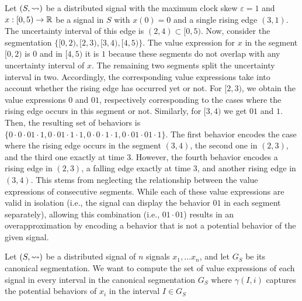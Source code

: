 \begin{example}
	Let $(S,{\rightsquigarrow})$ be a distributed signal with the maximum clock skew $\varepsilon = 1$ and $x : [0,5) \to \mathbb{R}$ be a signal in $S$ with $x(0) = 0$ and a single rising edge $(3, 1)$.
	The uncertainty interval of this edge is $(2,4) \subset [0,5)$.
	Now, consider the segmentation $\{ [0,2), [2,3), [3,4), [4,5) \}$.
	The value expression for $x$ in the segment $[0,2)$ is $0$ and in $[4,5)$ it is $1$ because these segments do not overlap with any uncertainty interval of $x$.
	The remaining two segments split the uncertainty interval in two.
	Accordingly, the corresponding value expressions take into account whether the rising edge has occurred yet or not.
	For $[2,3)$, we obtain the value expressions $0$ and $01$, respectively corresponding to the cases where the rising edge occurs in this segment or not.
	Similarly, for $[3,4)$ we get $01$ and $1$.
	Then, the resulting set of behaviors is $\{ 0 \cdot 0 \cdot 01 \cdot 1, 0 \cdot 01 \cdot 1 \cdot 1, 0 \cdot 0 \cdot 1 \cdot 1, 0 \cdot 01 \cdot 01 \cdot 1 \}$.
	The first behavior encodes the case where the rising edge occurs in the segment $(3,4)$, the second one in $(2,3)$, and the third one exactly at time $3$.
	However, the fourth behavior encodes a rising edge in $(2,3)$, a falling edge exactly at time $3$, and another rising edge in $(3,4)$.
	This stems from neglecting the relationship between the value expressions of consecutive segments.
	While each of these value expressions are valid in isolation (i.e., the signal can display the behavior $01$ in each segment separately), allowing this combination (i.e., $01 \cdot 01$) results in an overapproximation by encoding a behavior that is not a potential behavior of the given signal.
\end{example}

Let $(S,{\rightsquigarrow})$ be a distributed signal of $n$ signals $x_1, \ldots x_n$, and let $G_S$ be its canonical segmentation. %
We want to compute the set of value expressions of each signal in every interval in the canonical segmentation $G_S$ where $\gamma(I, i)$ captures the potential behaviors of $x_i$ in the interval $I \in G_S$

